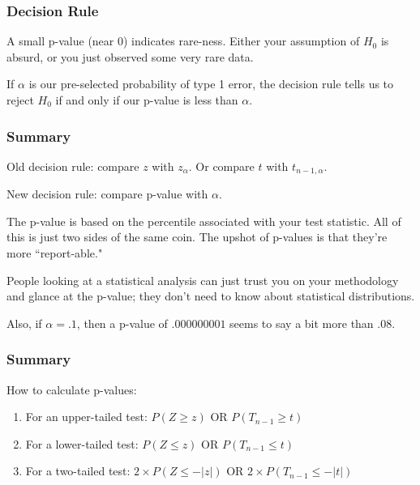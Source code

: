 \documentclass{beamer}
\begin{document}
\begin{frame}
\frametitle{Decision Rule}

A small p-value (near 0) indicates rare-ness. Either your assumption of $H_0$ is absurd, or you just observed some very rare data. 
\newline

If $\alpha$ is our pre-selected probability of type 1 error, the decision rule tells us to reject $H_0$ if and only if our p-value is less than $\alpha$.

\end{frame}


\begin{frame}
\frametitle{Summary}

Old decision rule: compare $z$ with $z_{\alpha}$. Or compare $t$ with $t_{n-1,\alpha}$.
\newline

New decision rule: compare p-value with $\alpha$. 
\newline

The p-value is based on the percentile associated with your test statistic. All of this is just two sides of the same coin. The upshot of p-values is that they're more ``report-able." 
\newline

People looking at a statistical analysis can just trust you on your methodology and glance at the p-value; they don't need to know about statistical distributions.
\newline

Also, if $\alpha = .1$, then a p-value of $.000000001$ seems to say a bit more than $.08$. 


\end{frame}


\begin{frame}
\frametitle{Summary}

How to calculate p-values:
\begin{enumerate}
\item For an upper-tailed test: $P(Z \ge z)$ OR $P(T_{n-1} \ge t)$ 
\item For a lower-tailed test: $P(Z \le z)$ OR $P(T_{n-1} \le t)$ 
\item For a two-tailed test: $2 \times P(Z \le -|z|)$ OR $2 \times P(T_{n-1} \le -|t|)$ 
\end{enumerate}


\end{frame}
\end{document}

